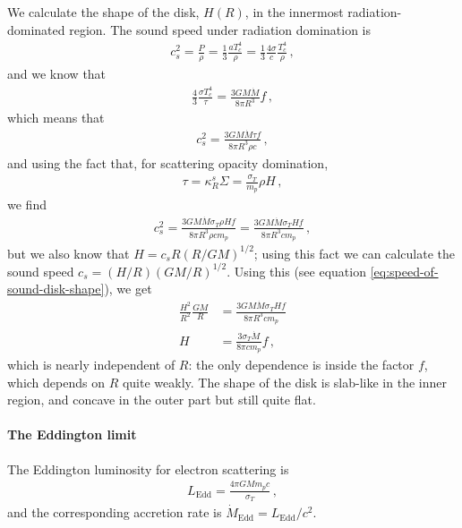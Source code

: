 \documentclass[main.tex]{subfiles}
\begin{document}
We calculate the shape of the disk, \(H(R)\), in the innermost radiation-dominated region.
The sound speed under radiation domination is
%
\begin{align}
c_s^2 = \frac{P}{\rho } = \frac{1}{3} \frac{a T_c^{4}}{\rho} = \frac{1}{3} \frac{4 \sigma }{c} \frac{T_c^{4}}{\rho }
\,,
\end{align}
%
and we know that 
%
\begin{align}
\frac{4}{3} \frac{\sigma T_c^{4}}{\tau } = \frac{3 GM \dot{M}}{8 \pi R^3} f
\,,
\end{align}
%
which means that 
%
\begin{align}
c_s^2 = \frac{3 GM \dot{M} \tau f}{8 \pi R^3 \rho c}
\,,
\end{align}
%
and using the fact that, for scattering opacity domination, 
%
\begin{align}
\tau = \kappa _R^{s} \Sigma = \frac{\sigma _T}{m_p} \rho H
\,,
\end{align}
%
we find 
%
\begin{align}
c_s^2 =  
\frac{3 GM \dot{M} \sigma _T \rho H f}{8 \pi R^3 \rho  c m_p} =
\frac{3 GM \dot{M} \sigma _T  H f}{8 \pi R^3   c m_p}
\,,
\end{align}
%
but we also know that \(H = c_s R (R / GM)^{1/2}\); using this fact we can calculate the sound speed \(c_s = (H/R)(GM/R)^{1/2} \). 
Using this (see equation \eqref{eq:speed-of-sound-disk-shape}), we get 
%
\begin{align}
\frac{H^2}{R^2} \frac{GM}{R} &= \frac{3 GM \dot{M} \sigma _T  H f}{8 \pi R^3   c m_p} \\
H &= \frac{3 \sigma _T \dot{M} }{8 \pi c m_p}f 
\,,
\end{align}
%
which is nearly independent of \(R\): the only dependence is inside the factor \(f\), which depends on \(R\) quite weakly. 
The shape of the disk is slab-like in the inner region, and concave in the outer part but still quite flat. 

\paragraph{The Eddington limit}

The Eddington luminosity for electron scattering is 
%
\begin{align}
L _{\text{Edd}} = \frac{4 \pi G M m_p c}{\sigma _T}
\,,
\end{align}
%
and the corresponding accretion rate is \(\dot{M} _{\text{Edd}} = L _{\text{Edd}} / c^2\). 
\end{document}
